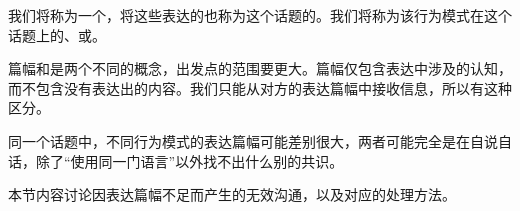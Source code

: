 我们将称为一个，将这些表达的也称为这个话题的。我们将称为该行为模式在这个话题上的、或。%
\begin{explain}
篇幅和是两个不同的概念，出发点的范围要更大。篇幅仅包含表达中涉及的认知，而不包含没有表达出的内容。我们只能从对方的表达篇幅中接收信息，所以有这种区分。

同一个话题中，不同行为模式的表达篇幅可能差别很大，两者可能完全是在自说自话，除了“使用同一门语言”以外找不出什么别的共识。

\end{explain}
本节内容讨论因表达篇幅不足而产生的无效沟通，以及对应的处理方法。

